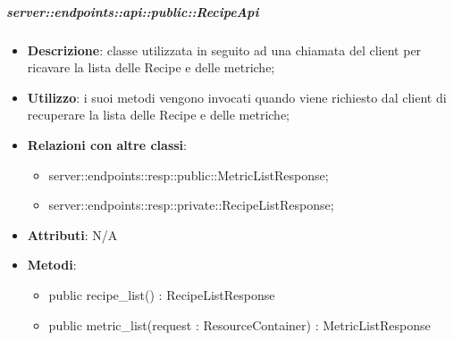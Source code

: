     \subparagraph{server::endpoints::api::public::RecipeApi} %
    \label{subp:bdsm_app_server_endpoints_api_public_recipeapi}
    \begin{itemize}
      \item \textbf{Descrizione}: classe utilizzata in seguito ad una chiamata del client per ricavare la lista delle Recipe e delle metriche;
      \item \textbf{Utilizzo}: i suoi metodi vengono invocati quando viene richiesto dal client di recuperare la lista delle Recipe e delle metriche;
      \item \textbf{Relazioni con altre classi}:
        \begin{itemize}
          \item server::endpoints::resp::public::MetricListResponse;
          \item server::endpoints::resp::private::RecipeListResponse;
        \end{itemize}
		\item \textbf{Attributi}: N/A
		\item \textbf{Metodi}:   
			\begin{itemize}
				\item public recipe\_list() : RecipeListResponse
				\item public metric\_list(request : ResourceContainer) : MetricListResponse
			\end{itemize}
      \end{itemize}

